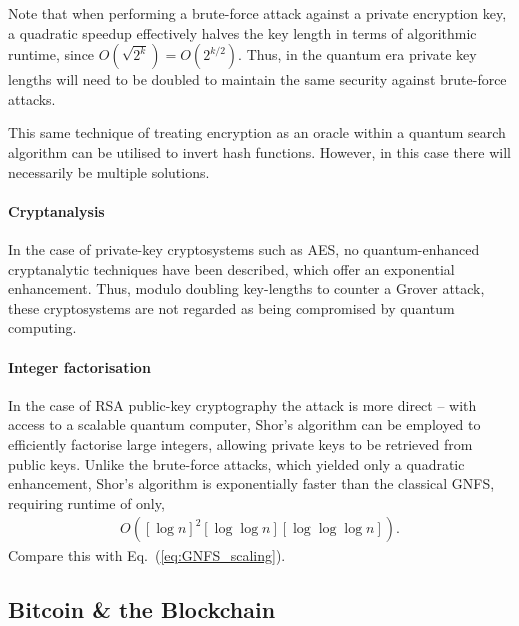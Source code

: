 Note that when performing a brute-force attack against a private encryption key, a quadratic speedup effectively halves the key length in terms of algorithmic runtime, since \mbox{$O(\sqrt{2^k}) = O(2^{k/2})$}. Thus, in the quantum era private key lengths will need to be doubled to maintain the same security against brute-force attacks.

This same technique of treating encryption as an oracle within a quantum search algorithm can be utilised to invert hash functions. However, in this case there will necessarily be multiple solutions.

%
%

\paragraph{Cryptanalysis}

In the case of private-key cryptosystems such as AES, no quantum-enhanced cryptanalytic techniques have been described, which offer an exponential enhancement. Thus, modulo doubling key-lengths to counter a Grover attack, these cryptosystems are not regarded as being compromised by quantum computing.

%
%

\paragraph{Integer factorisation}

In the case of RSA public-key cryptography the attack is more direct -- with access to a scalable quantum computer, Shor's algorithm can be employed to efficiently factorise large integers, allowing private keys to be retrieved from public keys. Unlike the brute-force attacks, which yielded only a quadratic enhancement, Shor's algorithm is exponentially faster than the classical GNFS, requiring runtime of only,
\begin{align}
	O([\log n]^2[\log\log n][\log\log\log n]).
\end{align}
Compare this with Eq.~(\ref{eq:GNFS_scaling}).

%
%

\subsection{Bitcoin \& the Blockchain}

